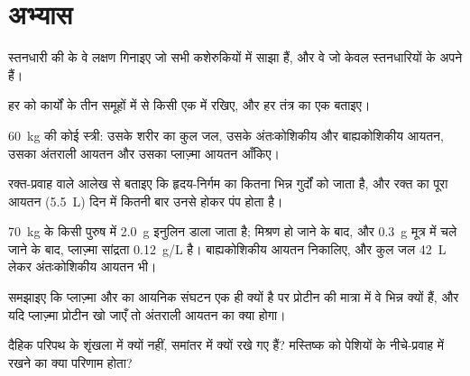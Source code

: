 \section{अभ्यास}

\begin{exercise}[$\star$]\label{exo:b1:mammal-organization:1}
स्तनधारी की  के वे लक्षण गिनाइए जो सभी कशेरुकियों में साझा
हैं, और वे जो केवल स्तनधारियों के अपने हैं।
\end{exercise}

\begin{exercise}[$\star$]\label{exo:b1:mammal-organization:2}
हर  को कार्यों के तीन समूहों में से किसी एक में रखिए, और हर
तंत्र का एक  बताइए।
\end{exercise}

\begin{exercise}[$\star$]\label{exo:b1:mammal-organization:3}
\qty{60}{kg} की कोई स्त्री: उसके शरीर का कुल जल, उसके अंतःकोशिकीय और
बाह्यकोशिकीय आयतन, उसका अंतराली आयतन और उसका प्लाज़्मा आयतन आँकिए।
\end{exercise}

\begin{exercise}[$\star$]\label{exo:b1:mammal-organization:4}
रक्त-प्रवाह वाले आलेख से बताइए कि हृदय-निर्गम का कितना भिन्न गुर्दों को
जाता है, और रक्त का पूरा आयतन (\qty{5.5}{L}) दिन में कितनी बार उनसे
होकर पंप होता है।
\end{exercise}

\begin{exercise}[$\star\star$]\label{exo:b1:mammal-organization:5}
\qty{70}{kg} के किसी पुरुष में \qty{2.0}{g} इनुलिन डाला जाता है; मिश्रण
हो जाने के बाद, और \qty{0.3}{g} मूत्र में चले जाने के बाद, प्लाज़्मा
सांद्रता \qty{0.12}{g/L} है। बाह्यकोशिकीय आयतन निकालिए, और कुल जल
\qty{42}{L} लेकर अंतःकोशिकीय आयतन भी।
\end{exercise}

\begin{exercise}[$\star\star$]\label{exo:b1:mammal-organization:6}
समझाइए कि प्लाज़्मा और  का आयनिक संघटन एक ही क्यों है पर
प्रोटीन की मात्रा में वे भिन्न क्यों हैं, और यदि प्लाज़्मा प्रोटीन खो
जाएँ तो अंतराली आयतन का क्या होगा।
\end{exercise}

\begin{exercise}[$\star\star$]\label{exo:b1:mammal-organization:7}
दैहिक परिपथ के  शृंखला में क्यों नहीं, समांतर में क्यों रखे गए हैं?
मस्तिष्क को पेशियों के नीचे-प्रवाह में रखने का क्या परिणाम होता?
\end{exercise}


